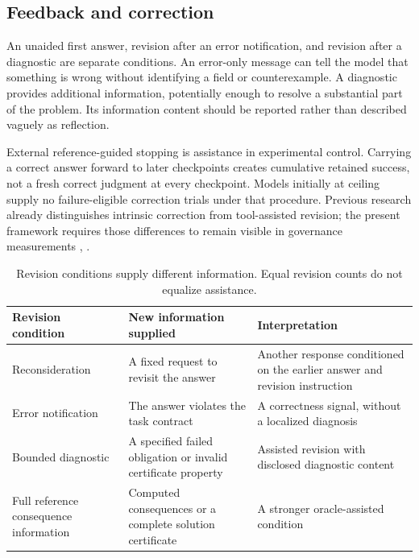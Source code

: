 \documentclass[a4paper,preprint,12pt,numbers,nopreprintline]{elsarticle}
\begin{document}
\subsection{Feedback and correction}

An unaided first answer, revision after an error notification, and revision after a diagnostic are separate conditions. An error-only message can tell the model that something is wrong without identifying a field or counterexample. A diagnostic provides additional information, potentially enough to resolve a substantial part of the problem. Its information content should be reported rather than described vaguely as reflection.

External reference-guided stopping is assistance in experimental control. Carrying a correct answer forward to later checkpoints creates cumulative retained success, not a fresh correct judgment at every checkpoint. Models initially at ceiling supply no failure-eligible correction trials under that procedure. Previous research already distinguishes intrinsic correction from tool-assisted revision; the present framework requires those differences to remain visible in governance measurements \citep{huang}, \citep{critic}.

\begin{table}[htbp]\centering\small
\caption{Revision conditions supply different information. Equal revision counts do not equalize assistance.}\label{tab:foundation-5}

\begin{tabularx}{\linewidth}{@{}*{3}{>{\raggedright\arraybackslash}X}@{}}\toprule
Revision condition & New information supplied & Interpretation\\
\midrule
Reconsideration & A fixed request to revisit the answer & Another response conditioned on the earlier answer and revision instruction\\
Error notification & The answer violates the task contract & A correctness signal, without a localized diagnosis\\
Bounded diagnostic & A specified failed obligation or invalid certificate property & Assisted revision with disclosed diagnostic content\\
Full reference consequence information & Computed consequences or a complete solution certificate & A stronger oracle-assisted condition\\
\bottomrule\end{tabularx}
\end{table}
\end{document}
